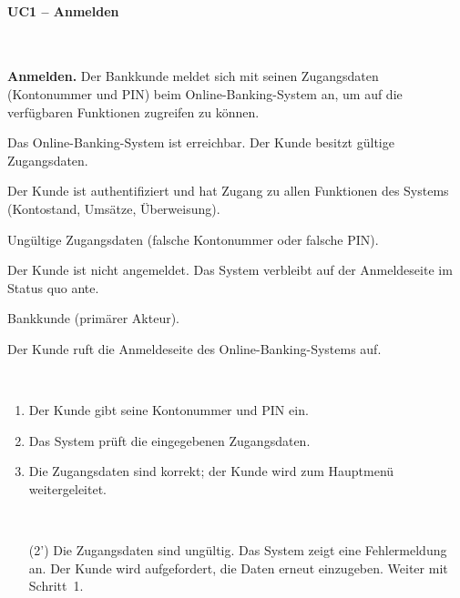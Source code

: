 \documentclass[12pt]{scrartcl}
\begin{document}
    \paragraph{UC1 -- Anmelden}~\\[4pt]
    \begin{description}[leftmargin=4.5cm, style=nextline, font=\normalfont\bfseries]
  \item[Name und Kurzbeschreibung:]
  \textbf{Anmelden.}
  Der Bankkunde meldet sich mit seinen Zugangsdaten (Kontonummer und PIN) beim
  Online-Banking-System an, um auf die verf\"ugbaren Funktionen zugreifen zu k\"onnen.

  \item[Vorbedingung:]
  Das Online-Banking-System ist erreichbar. Der Kunde besitzt g\"ultige Zugangsdaten.

  \item[Nachbedingung:]
  Der Kunde ist authentifiziert und hat Zugang zu allen Funktionen des Systems
  (Kontostand, Ums\"atze, \"Uberweisung).

  \item[Fehlersituationen:]
  Ung\"ultige Zugangsdaten (falsche Kontonummer oder falsche PIN).

  \item[Systemzustand im Fehlerfall:]
  Der Kunde ist nicht angemeldet. Das System verbleibt auf der Anmeldeseite
  im Status quo ante.

  \item[Akteure:]
  Bankkunde (prim\"arer Akteur).

  \item[Trigger:]
  Der Kunde ruft die Anmeldeseite des Online-Banking-Systems auf.

  \item[Standardablauf:]~
  \begin{enumerate}
      \item Der Kunde gibt seine Kontonummer und PIN ein.
      \item Das System pr\"uft die eingegebenen Zugangsdaten.
      \item Die Zugangsdaten sind korrekt; der Kunde wird zum Hauptmen\"u
      weitergeleitet.
  \end{enumerate}

  \item[Alternativablauf:]~
  \begin{itemize}
      \item[(2')] Die Zugangsdaten sind ung\"ultig. Das System zeigt eine
      Fehlermeldung an. Der Kunde wird aufgefordert, die Daten erneut
      einzugeben. Weiter mit Schritt~1.
  \end{itemize}
    \end{description}
\end{document}
